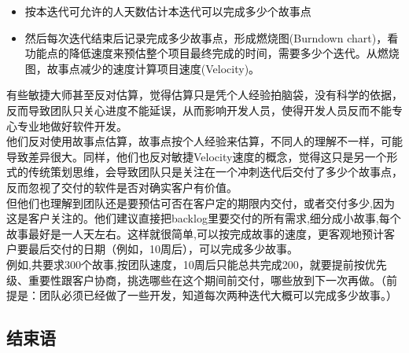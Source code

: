 \begin{itemize}
\tightlist
\item
  按本迭代可允许的人天数估计本迭代可以完成多少个故事点
\item
  然后每次迭代结束后记录完成多少故事点，形成燃烧图(Burndown chart)，看功能点的降低速度来预估整个项目最终完成的时间，需要多少个迭代。从燃烧图，故事点减少的速度计算项目速度(Velocity)。
\end{itemize}

\begin{description}
\item[]
\begin{description}
\tightlist
\item[]
+ + +
\end{description}
\end{description}

有些敏捷大师甚至反对估算，觉得估算只是凭个人经验拍脑袋，没有科学的依据，反而导致团队只关心进度不能延误，从而影响开发人员，使得开发人员反而不能专心专业地做好软件开发。\\
他们反对使用故事点估算，故事点按个人经验来估算，不同人的理解不一样，可能导致差异很大。同样，他们也反对敏捷Velocity速度的概念，觉得这只是另一个形式的传统策划思维，会导致团队只是关注在一个冲刺迭代后交付了多少个故事点，反而忽视了交付的软件是否对确实客户有价值。\\
但他们也理解到团队还是要预估可否在客户定的期限内交付，或者交付多少,因为这是客户关注的。他们建议直接把backlog里要交付的所有需求,细分成小故事,每个故事最好是一人天左右。这样就很简单,可以按完成故事的速度，更客观地预计客户要最后交付的日期（例如，10周后），可以完成多少故事。\\
例如,共要求300个故事,按团队速度，10周后只能总共完成200，就要提前按优先级、重要性跟客户协商，挑选哪些在这个期间前交付，哪些放到下一次再做。（前提是：团队必须已经做了一些开发，知道每次两种迭代大概可以完成多少故事。）\\

\hypertarget{ux4f30ux7b97ux9760ux6a21ux578bux8fd8ux662fux9760ux4e13ux5bb6model-based-vs-expert-based-estimation}{%
\subsection{结束语}\label{ux4f30ux7b97ux9760ux6a21ux578bux8fd8ux662fux9760ux4e13ux5bb6model-based-vs-expert-based-estimation}}


